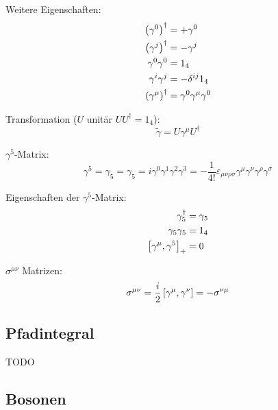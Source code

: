 			\noindent
			Weitere Eigenschaften:
			\begin{equation}
				\begin{aligned}
					\Br{\gamma^0}^\dagger &= +\gamma^0 \\
					\Br{\gamma^j}^\dagger &= -\gamma^j \\
					\gamma^0 \gamma^0 &= 1_4 \\ %
					\gamma^i \gamma^j &= - \delta^{ij} 1_4 \\
					\Br{\gamma^\mu}^\dagger &= \gamma^0 \gamma^\mu \gamma^0 \\
				\end{aligned}
			\end{equation}

			\noindent
			Transformation ($U$ unitär $U U^\dagger=1_4$):
			\begin{equation}
				\tilde{\gamma} = U \gamma^\mu U^\dagger
			\end{equation}

			\noindent
			$\gamma^5$-Matrix:
			\begin{equation}
				\gamma^5 = \gamma_5 = \gamma_5 = i\gamma^0 \gamma^1 \gamma^2 \gamma^3 = -\frac{1}{4!}\varepsilon_{\mu\nu\rho\sigma} \gamma^\mu \gamma^\nu \gamma^\rho \gamma^\sigma
			\end{equation}

			\noindent
			Eigenschaften der $\gamma^5$-Matrix:
			\begin{equation}
				\begin{aligned}
					\gamma_5^\dagger &= \gamma_5 \\
					\gamma_5 \gamma_5 &= 1_4 \\
					\left[\gamma^\mu,\gamma^5\right]_{+} &= 0 \\
				\end{aligned}
			\end{equation}

			\noindent
			$\sigma^{\mu\nu}$ Matrizen:
			\begin{equation}
				\sigma^{\mu\nu} = \frac{i}{2}\left[\gamma^\mu,\gamma^\nu\right] = -\sigma^{\nu\mu}
			\end{equation}


	\subsection{Pfadintegral}
		TODO

	\subsection{Bosonen}
